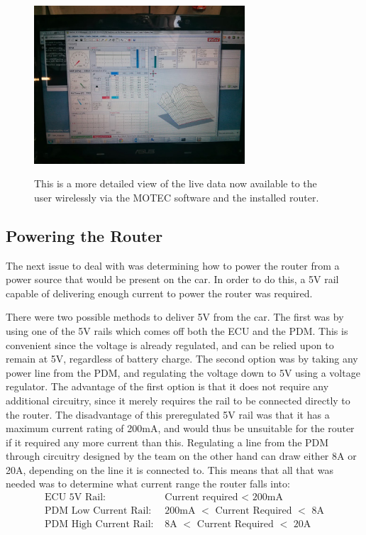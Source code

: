 \begin{figure}[ht]
  \caption{This is a more detailed view of the live data now available to the user wirelessly via the MOTEC software and the installed router.}
  \centering
    \includegraphics[width=0.7\textwidth]{Images/Telemetry/TEL_readout.jpg}
    \label{TEL_readout}
\end{figure}

\subsection{Powering the Router}
The next issue to deal with was determining how to power the router from a power source that would be present on the car. In order to do this, a 5V rail capable of delivering enough current to power the router was required. 

There were two possible methods to deliver 5V from the car. The first was by using one of the 5V rails which comes off both the ECU and the PDM. This is convenient since the voltage is already regulated, and can be relied upon to remain at 5V, regardless of battery charge. The second option was by taking any power line from the PDM, and regulating the voltage down to 5V using a voltage regulator. The advantage of the first option is that it does not require any additional circuitry, since it merely requires the rail to be connected directly to the router. The disadvantage of this preregulated 5V rail was that it has a maximum current rating of 200mA, and would thus be unsuitable for the router if it required any more current than this. Regulating a line from the PDM through circuitry designed by the team on the other hand can draw either 8A or 20A, depending on the line it is connected to. This means that all that was needed was to determine what current range the router falls into: 
\begin{align*}
\text{ECU 5V Rail:  } &\text{Current required $<$ 200mA}\\
\text{PDM Low Current Rail:  } &\text{200mA $<$ Current Required $<$ 8A}\\
\text{PDM High Current Rail:  } &\text{8A $<$ Current Required $<$ 20A}
\end{align*}

